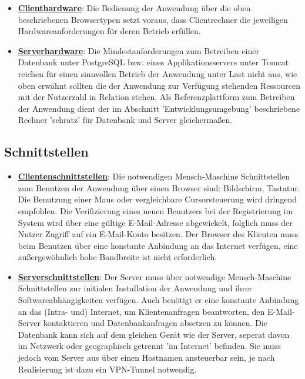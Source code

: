 \documentclass{article}
\begin{document}
\begin{itemize}
\item \underline{\textbf{Clienthardware}}: \linebreak
Die Bedienung der Anwendung über die oben beschriebenen Browsertypen setzt voraus, dass Clientrechner die jeweiligen Hardwareanforderungen für deren Betrieb erfüllen.
\item \underline{\textbf{Serverhardware}}: \linebreak
Die Mindestanforderungen zum Betreiben einer Datenbank unter PostgreSQL bzw. eines Applikationsservers unter Tomcat reichen für einen sinnvollen Betrieb der Anwendung unter Last nicht aus, wie oben erwähnt sollten die der Anwendung zur Verfügung stehenden Ressourcen mit der Nutzerzahl in Relation stehen. Als Referenzplattform zum Betreiben der Anwendung dient der im Abschnitt 'Entwicklungsumgebung' beschriebene Rechner 'schratz' für Datenbank und Server gleichermaßen.
\end{itemize}

\subsection{Schnittstellen}

\begin{itemize}
\item \underline{\textbf{Clientenschnittstellen}}: \linebreak
Die notwendigen Mensch-Maschine Schnittstellen zum Benutzen der Anwendung über einen Browser sind: Bildschirm, Tastatur. Die Benutzung einer Maus oder vergleichbare Cursorsteuerung wird dringend empfohlen. Die Verifizierung eines neuen Benutzers bei der Registrierung im System wird über eine gültige E-Mail-Adresse abgewickelt, folglich muss der Nutzer Zugriff auf ein E-Mail-Konto besitzen. Der Browser des Klienten muss beim Benutzen über eine konstante Anbindung an das Internet verfügen, eine außergewöhnlich hohe Bandbreite ist nicht erforderlich.
\item \underline{\textbf{Serverschnittstellen}}: \linebreak
Der Server muss über notwendige Mensch-Maschine Schnittstellen zur initialen Installation der Anwendung und ihrer Softwareabhängigkeiten verfügen. Auch benötigt er eine konstante Anbindung an das (Intra- und) Internet, um Klientenanfragen beantworten, den E-Mail-Server kontaktieren und Datenbankanfragen absetzen zu können. Die Datenbank kann sich auf dem gleichen Gerät wie der Server, seperat davon im Netzwerk oder geographisch getrennt 'im Internet' befinden. Sie muss jedoch vom Server aus über einen Hostnamen ansteuerbar sein, je nach Realisierung ist dazu ein VPN-Tunnel notwendig. 
\end{itemize}
\end{document}
